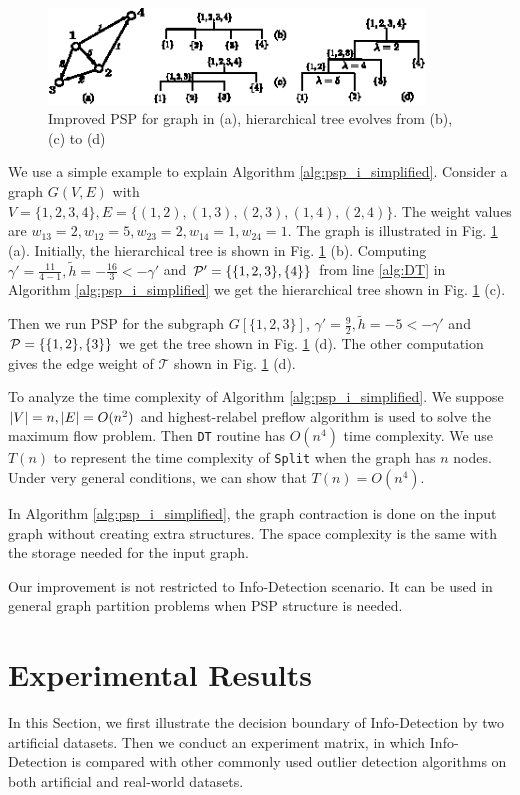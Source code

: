 \documentclass[runningheads]{llncs}
\begin{document}
\begin{figure}[!ht]
	\centering
	\includegraphics[width=10cm]{pic/alg_illustration.eps}
	\caption{Improved PSP for graph in (a), hierarchical tree evolves from (b), (c) to (d) }\label{fig:alg_eg}
\end{figure}

\begin{example}
	We use a simple example to explain Algorithm \ref{alg:psp_i_simplified}. Consider a graph $G(V, E)$ with $V=\{1,2,3,4\}, E=\{(1,2),(1,3),(2,3),(1,4),(2,4)\}$. The weight values are $w_{13}=2, w_{12}=5, w_{23}=2, w_{14}=1, w_{24}=1$. The graph is illustrated
	in Fig. \ref{fig:alg_eg} (a). Initially, the hierarchical tree is shown in Fig. \ref{fig:alg_eg} (b). Computing $\gamma' = \frac{11}{4-1}, \tilde{h} = -\frac{16}{3} < -\gamma' $ and $\P' = \{\{1,2,3\},\{4\}\}$ from line \ref {alg:DT} in Algorithm \ref{alg:psp_i_simplified} we get the hierarchical tree shown in Fig. \ref{fig:alg_eg} (c).
	
	Then we run PSP for the subgraph $G[\{1,2,3\}]$, $\gamma' = \frac{9}{2}, \tilde{h} = -5 < -\gamma'$ and $\P= \{\{1,2\},\{3\}\}$ we get the tree shown in Fig. \ref{fig:alg_eg} (d). The other computation gives the edge weight of $\mathcal{T}$ shown in Fig. \ref{fig:alg_eg} (d).
\end{example}		

To analyze the time complexity of Algorithm \ref{alg:psp_i_simplified}. We suppose $\abs{V} = n, \abs{E} = O(n^2)$ and highest-relabel preflow algorithm is used to solve the maximum flow problem. Then \texttt{DT} routine has $O(n^4)$ time complexity. 
We use $T(n)$ to represent the time complexity of \texttt{Split} when the graph has $n$ nodes. Under very general conditions, we can show that $T(n) = O(n^4)$. 

In Algorithm \ref{alg:psp_i_simplified}, the graph contraction is done on the input graph without creating extra structures. The space complexity is the same with the storage needed for the input graph. 

Our improvement is not restricted to Info-Detection scenario. It can be used in general graph partition problems when PSP structure is needed.

\section{Experimental Results}\label{sec:Experiemt}
In this Section, we first illustrate the decision boundary of Info-Detection by two artificial datasets. Then we conduct an experiment matrix, in which Info-Detection is compared with other commonly used outlier detection algorithms on both artificial and real-world datasets.
\end{document}
